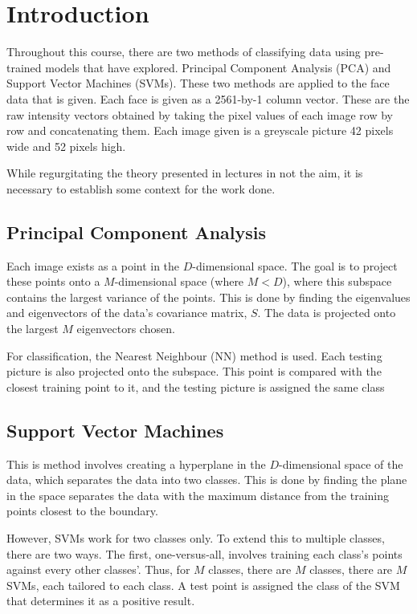 \documentclass[a4paper, 10pt, conference]{ieeeconf}
\begin{document}
\section{Introduction}
Throughout this course, there are two methods of classifying data using pre-trained models that have explored. Principal Component Analysis (PCA) and Support Vector Machines (SVMs). These two methods are applied to the face data that is given. Each face is given as a 2561-by-1 column vector. These are the raw intensity vectors obtained by taking the pixel values of each image row by row and concatenating them. Each image given is a greyscale picture 42 pixels wide and 52 pixels high.

While regurgitating the theory presented in lectures in not the aim, it is necessary to establish some context for the work done.

\subsection{Principal Component Analysis}\label{sec:pcatheory}
Each image exists as a point in the $D$-dimensional space. The goal is to project these points onto a $M$-dimensional space (where $ M < D$), where this subspace contains the largest variance of the points. This is done by finding the eigenvalues and eigenvectors of the data's covariance matrix, $S$. The data is projected onto the largest $M$ eigenvectors chosen.

For classification, the Nearest Neighbour (NN) method is used. Each testing picture is also projected onto the subspace. This point is compared with the closest training point to it, and the testing picture is assigned the same class

\subsection{Support Vector Machines}\label{sec:svmtheory}
This is method involves creating a hyperplane in the $D$-dimensional space of the data, which separates the data into two classes. This is done by finding the plane in the space separates the data with the maximum distance from the training points closest to the boundary.

However, SVMs work for two classes only. To extend this to multiple classes, there are two ways. The first, one-versus-all, involves training each class's points against every other classes'. Thus, for $M$ classes, there are $M$ classes, there are $M$ SVMs, each tailored to each class. A test point is assigned the class of the SVM that determines it as a positive result.
\end{document}
